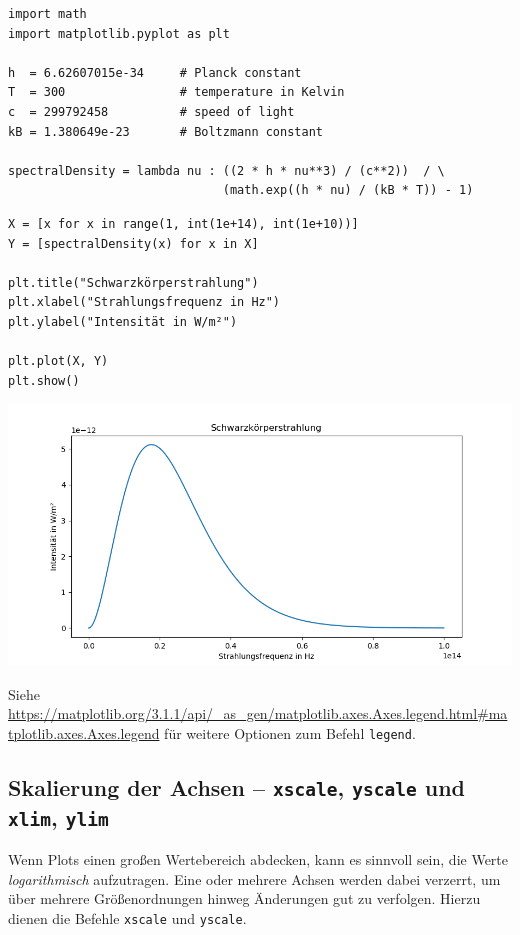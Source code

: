 \begin{codebox}
\begin{verbatim}
import math
import matplotlib.pyplot as plt

h  = 6.62607015e-34     # Planck constant
T  = 300                # temperature in Kelvin
c  = 299792458          # speed of light
kB = 1.380649e-23       # Boltzmann constant

spectralDensity = lambda nu : ((2 * h * nu**3) / (c**2))  / \
                              (math.exp((h * nu) / (kB * T)) - 1)
\end{verbatim}
\end{codebox}
%
\begin{codebox}[]
\begin{verbatim}
X = [x for x in range(1, int(1e+14), int(1e+10))]
Y = [spectralDensity(x) for x in X]

plt.title("Schwarzkörperstrahlung")
plt.xlabel("Strahlungsfrequenz in Hz")
plt.ylabel("Intensität in W/m²")

plt.plot(X, Y)
plt.show()
\end{verbatim}
\end{codebox}
%
\begin{tcolorbox}[title=Ausgabe: Plot mit Titel und Labels]
	\includegraphics[width=\linewidth]{./gfx/plt-labels}
\end{tcolorbox}

Siehe \url{https://matplotlib.org/3.1.1/api/_as_gen/matplotlib.axes.Axes.legend.html#matplotlib.axes.Axes.legend} für weitere Optionen zum Befehl \texttt{legend}.

\subsection{Skalierung der Achsen -- \texttt{xscale}, \texttt{yscale} und \texttt{xlim}, \texttt{ylim}}
Wenn Plots einen großen Wertebereich abdecken, kann es sinnvoll sein, die Werte \emph{logarithmisch} aufzutragen. Eine oder mehrere Achsen werden dabei verzerrt, um über mehrere Größenordnungen hinweg Änderungen gut zu verfolgen. Hierzu dienen die Befehle \texttt{xscale} und \texttt{yscale}.

